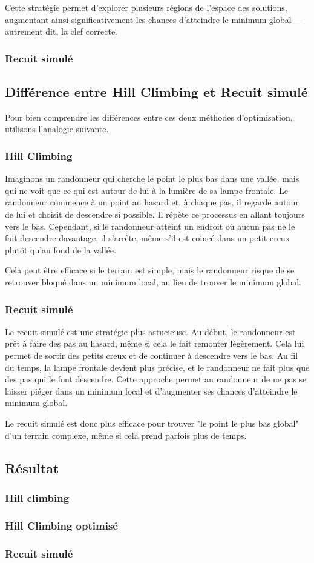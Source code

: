 \documentclass[a4paper]{article}
\begin{document}
Cette stratégie permet d’explorer plusieurs régions de l’espace des solutions, augmentant ainsi significativement les chances d’atteindre le minimum global — autrement dit, la clef correcte.

\subsubsection{Recuit simulé}


\subsection{Différence entre Hill Climbing et Recuit simulé}

Pour bien comprendre les différences entre ces deux méthodes d'optimisation, utilisons l'analogie suivante.

\subsubsection{Hill Climbing}

Imaginons un randonneur qui cherche le point le plus bas dans une vallée, mais qui ne voit que ce qui est autour de lui à la lumière de sa lampe frontale. Le randonneur commence à un point au hasard et, à chaque pas, il regarde autour de lui et choisit de descendre si possible. Il répète ce processus en allant toujours vers le bas. Cependant, si le randonneur atteint un endroit où aucun pas ne le fait descendre davantage, il s'arrête, même s'il est coincé dans un petit creux plutôt qu'au fond de la vallée.

Cela peut être efficace si le terrain est simple, mais le randonneur risque de se retrouver bloqué dans un minimum local, au lieu de trouver le minimum global.

\subsubsection{Recuit simulé}

Le recuit simulé est une stratégie plus astucieuse. Au début, le randonneur est prêt à faire des pas au hasard, même si cela le fait remonter légèrement. Cela lui permet de sortir des petits creux et de continuer à descendre vers le bas. Au fil du temps, la lampe frontale devient plus précise, et le randonneur ne fait plus que des pas qui le font descendre. Cette approche permet au randonneur de ne pas se laisser piéger dans un minimum local et d'augmenter ses chances d'atteindre le minimum global.

Le recuit simulé est donc plus efficace pour trouver "le point le plus bas global" d'un terrain complexe, même si cela prend parfois plus de temps.

\subsection{Résultat}
\subsubsection{Hill climbing}
\subsubsection{Hill Climbing optimisé}
\subsubsection{Recuit simulé}
\end{document}
